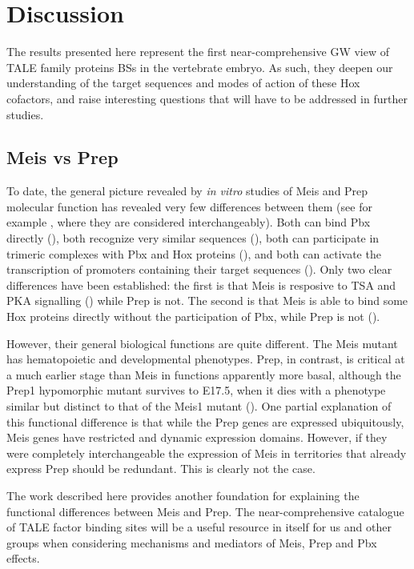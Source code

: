 \chapter{Discussion}
\label{chp:discussion}

The results presented here represent the first near-comprehensive \ac{GW} view of \ac{TALE} family proteins \acp{BS} in the vertebrate embryo. As such, they deepen our understanding of the target sequences and modes of action of these Hox cofactors, and raise interesting questions that will have to be addressed in further studies. 

\section{Meis vs Prep}

To date, the general picture revealed by \textit{in vitro} studies of Meis and Prep molecular function has revealed very few differences between them (see for example \textcite{Moens2006}, where they are considered interchangeably). Both can bind Pbx directly (\cite{Knoepfler1997, Shen1997}), both recognize very similar sequences (\cite{Knoepfler1997, Chang1997}), both can participate in trimeric complexes with Pbx and Hox proteins (\cite{Berthelsen1998, Shen1999}), and both can activate the transcription of promoters containing their target sequences (\cite{Berthelsen1998, Jacobs1999}). Only two clear differences have been established: the first is that Meis is resposive to \ac{TSA} and \ac{PKA} signalling (\cite{Huang2005}) while Prep is not. The second is that Meis is able to bind some Hox proteins directly without the participation of Pbx, while Prep is not (\cite{Williams2005}).

However, their general biological functions are quite different. The Meis mutant has hematopoietic and developmental phenotypes. Prep, in contrast, is critical at a much earlier stage than Meis in functions apparently more basal, although the Prep1 hypomorphic mutant survives to E17.5, when it dies with a phenotype similar but distinct to that of the Meis1 mutant (\cite{Ferretti2006, DiRosa2007}). One partial explanation of this functional difference is that while the Prep genes are expressed ubiquitously, Meis genes have restricted and dynamic expression domains. However, if they were completely interchangeable the expression of Meis in territories that already express Prep should be redundant. This is clearly not the case. %

The work described here provides another foundation for explaining the functional differences between Meis and Prep. The near-comprehensive catalogue of \ac{TALE} factor binding sites will be a useful resource in itself for us and other groups when considering mechanisms and mediators of Meis, Prep and Pbx effects. 


